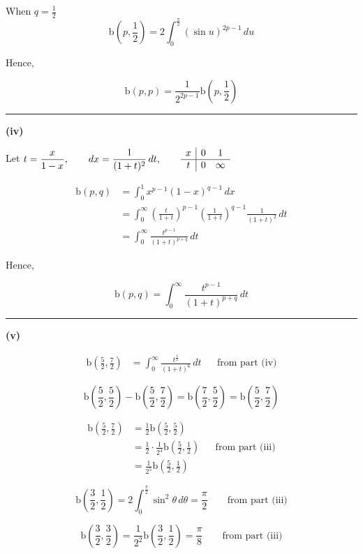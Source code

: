 \documentclass[12pt]{article}
\begin{document}
When $q=\frac{1}{2}$
$$\mathrm{b}\left(p,\frac12\right)
=2\int_0^{\frac{\pi}{2}}(\sin u)^{2p-1}\,du$$

Hence,

$$\boxed{
\mathrm{b}(p,p)
=\frac{1}{2^{2p-1}}\mathrm{b}\left(p,\frac12\right)
}$$

\bigskip\hrule\bigskip

\textbf{(iv)}

Let $t=\dfrac{x}{1-x},\qquad \displaystyle dx=\frac{1}{(1+t)^2}\,dt,\qquad
\begin{array}{c|cc}
x & 0 & 1\\
\hline
t & 0 & \infty
\end{array}
$

\begin{align*}
\mathrm{b}(p,q)
&=\int_0^1x^{p-1}(1-x)^{q-1}\,dx\\
&=\int_0^\infty
\left(\frac{t}{1+t}\right)^{p-1}
\left(\frac{1}{1+t}\right)^{q-1}
\frac{1}{(1+t)^2}\,dt\\
&=\int_0^\infty
\frac{t^{p-1}}{(1+t)^{p+q}}\,dt
\end{align*}

Hence,

$$\boxed{
\mathrm{b}(p,q)=\int_0^\infty
\frac{t^{p-1}}{(1+t)^{p+q}}\,dt
}$$

\bigskip\hrule\bigskip

\textbf{(v)}

\begin{align*}
\mathrm{b}\left(\frac52,\frac72\right)&=\int_0^\infty\frac{t^{\frac32}}{(1+t)^6}\,dt
&&\text{from part (iv)}
\end{align*}

$$\mathrm{b}\left(\frac52,\frac52\right)
-\mathrm{b}\left(\frac52,\frac72\right)=\mathrm{b}\left(\frac72,\frac52\right)=\mathrm{b}\left(\frac52,\frac72\right)
$$

$$
\begin{aligned}
\mathrm{b}\left(\frac52,\frac72\right)
&=\frac12\mathrm{b}\left(\frac52,\frac52\right)\\
&=\frac12\cdot\frac{1}{2^4}
\mathrm{b}\left(\frac52,\frac12\right)
&&\text{from part (iii)}\\
&=\frac{1}{2^5}\mathrm{b}\left(\frac52,\frac12\right)
\end{aligned}
$$


$$\mathrm{b}\left(\frac32,\frac12\right)=2\int_0^{\frac{\pi}{2}}\sin^2\theta\,d\theta=\frac{\pi}{2}\qquad \text{from part (iii)}$$

$$\mathrm{b}\left(\frac32,\frac32\right)=\frac{1}{2^2}\mathrm{b}\left(\frac32,\frac12\right)=\frac{\pi}{8}\qquad \text{from part (iii)}$$
\end{document}
